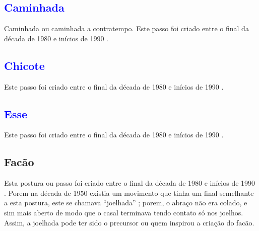 
\subsection{\textcolor{blue}{Caminhada}} 
 Caminhada ou caminhada a contratempo.
Este passo foi  criado entre o final da década de 1980 e inícios de 1990  \cite[pp. 143]{perna2002samba}.

\subsection{\textcolor{blue}{Chicote}} 
Este passo foi  criado entre o final da década de 1980 e inícios de 1990  \cite[pp. 143]{perna2002samba}.

\subsection{\textcolor{blue}{Esse}}
Este passo foi  criado entre o final da década de 1980 e inícios de 1990  \cite[pp. 143]{perna2002samba}.

\subsection{Facão}

\caracterpostura{\CheckedItem}{\NoCheckedItem}
Esta postura ou passo foi  criado entre o final da década de 1980 e inícios de 1990  \cite[pp. 143]{perna2002samba}.
Porem na década de 1950 existia um movimento que tinha um final semelhante a esta postura, 
este se chamava ``joelhada'' \cite[pp. 160]{fornaciari1950aprender};
porem, o abraço  não era colado,
e sim mais aberto de modo que o casal terminava tendo contato só nos joelhos.
Assim, a joelhada pode ter sido o precursor ou quem inspirou a criação do facão.

